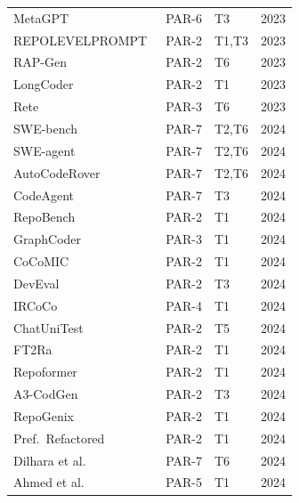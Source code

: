 \begin{longtable}{p{5cm}p{1.2cm}p{1.5cm}r}
MetaGPT~\cite{hong2023metagpt}                   & PAR-6 & T3       & 2023 \\
REPOLEVELPROMPT~\cite{shrivastava2023repolevel}   & PAR-2 & T1,T3    & 2023 \\
RAP-Gen~\cite{wang2023rapgen}                     & PAR-2 & T6       & 2023 \\
LongCoder~\cite{guo2023longcoder}                 & PAR-2 & T1       & 2023 \\
Rete~\cite{parasaram2023rete}                     & PAR-3 & T6       & 2023 \\
SWE-bench~\cite{jimenez2024swebench}              & PAR-7 & T2,T6    & 2024 \\
SWE-agent~\cite{yang2024sweagent}                 & PAR-7 & T2,T6    & 2024 \\
AutoCodeRover~\cite{zhang2024autocoderover}        & PAR-7 & T2,T6    & 2024 \\
CodeAgent~\cite{zhang2024codeagent}               & PAR-7 & T3       & 2024 \\
RepoBench~\cite{liu2024repobench}                 & PAR-2 & T1       & 2024 \\
GraphCoder~\cite{liu2024graphcoder}               & PAR-3 & T1       & 2024 \\
CoCoMIC~\cite{ding2024coccomic}                   & PAR-2 & T1       & 2024 \\
DevEval~\cite{li2024deveval}                      & PAR-2 & T3       & 2024 \\
IRCoCo~\cite{li2024ircoco}                       & PAR-4 & T1       & 2024 \\
ChatUniTest~\cite{chen2024chatunittest}            & PAR-2 & T5       & 2024 \\
FT2Ra~\cite{guo2024ft2ra}                        & PAR-2 & T1       & 2024 \\
Repoformer~\cite{wu2024repoformer}                & PAR-2 & T1       & 2024 \\
A3-CodGen~\cite{liao2024a3codgen}                 & PAR-2 & T3       & 2024 \\
RepoGenix~\cite{liang2024repogenix}               & PAR-2 & T1       & 2024 \\
Pref.\ Refactored~\cite{gao2024preference}        & PAR-2 & T1       & 2024 \\
Dilhara et al.~\cite{dilhara2024unprecedented}    & PAR-7 & T6       & 2024 \\
Ahmed et al.~\cite{ahmed2024automatic}             & PAR-5 & T1       & 2024 \\

\end{longtable}
